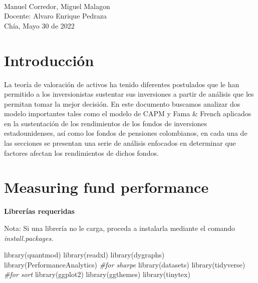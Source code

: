 \documentclass[
  12pt,
]{article}
\newenvironment{Shaded}{\begin{snugshade}}{\end{snugshade}}
\newcommand{\CommentTok}[1]{\textcolor[rgb]{0.56,0.35,0.01}{\textit{#1}}}
\newcommand{\FunctionTok}[1]{\textcolor[rgb]{0.00,0.00,0.00}{#1}}
\newcommand{\NormalTok}[1]{#1}
\begin{document}
\begin{titlepage}
\begin{minipage}{14cm}
\HRule \\[1.5cm]


{\Large
Manuel Corredor,
Miguel Malagon } \\[1cm]


{\Large
Docente: Alvaro Enrique Pedraza} \\[2cm]

{\large
Chía, Mayo 30 de 2022
}

\end{minipage}

\vfill %

\cleardoublepage
\thispagestyle{empty}
\end{titlepage}

\raggedbottom


{
\setcounter{tocdepth}{3}
\tableofcontents
}
\newpage

\hypertarget{introducciuxf3n}{%
\section{Introducción}\label{introducciuxf3n}}

La teoría de valoración de activos ha tenido diferentes postulados que
le han permitido a los inversionistas sustentar sus inversiones a partir
de análisis que les permitan tomar la mejor decisión. En este documento
buscamos analizar dos modelo importantes tales como el modelo de CAPM y
Fama \& French aplicados en la sustentación de los rendimientos de los
fondos de inversiones estadounidenses, así como los fondos de pensiones
colombianos, en cada una de las secciones se presentan una serie de
análisis enfocados en determinar que factores afectan los rendimientos
de dichos fondos. \newpage

\hypertarget{measuring-fund-performance}{%
\section{Measuring fund performance}\label{measuring-fund-performance}}

\textbf{Librerías requeridas}

Nota: Si una librería no le carga, proceda a instalarla mediante el
comando \emph{install.packages}.

\begin{Shaded}
\begin{Highlighting}[]
\FunctionTok{library}\NormalTok{(quantmod)}
\FunctionTok{library}\NormalTok{(readxl)}
\FunctionTok{library}\NormalTok{(dygraphs)}
\FunctionTok{library}\NormalTok{(PerformanceAnalytics) }\CommentTok{\#for sharpe}
\FunctionTok{library}\NormalTok{(datasets)}
\FunctionTok{library}\NormalTok{(tidyverse) }\CommentTok{\#for sort}
\FunctionTok{library}\NormalTok{(ggplot2)}
\FunctionTok{library}\NormalTok{(ggthemes)}
\FunctionTok{library}\NormalTok{(tinytex)}
\end{Highlighting}
\end{Shaded}
\end{document}
